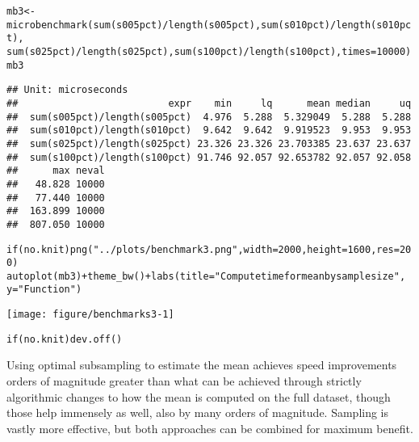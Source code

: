 \documentclass{article}\usepackage[]{graphicx}\usepackage[]{color}
\makeatletter
\def\maxwidth{ %
  \ifdim\Gin@nat@width>\linewidth
    \linewidth
  \else
    \Gin@nat@width
  \fi
}
\newcommand{\hlnum}[1]{\textcolor[rgb]{0.863,0.196,0.184}{#1}}%
\newcommand{\hlstr}[1]{\textcolor[rgb]{0.863,0.196,0.184}{#1}}%
\newcommand{\hlopt}[1]{\textcolor[rgb]{0.576,0.631,0.631}{#1}}%
\newcommand{\hlstd}[1]{\textcolor[rgb]{0.514,0.58,0.588}{#1}}%
\newcommand{\hlkwa}[1]{\textcolor[rgb]{0.796,0.294,0.086}{#1}}%
\newcommand{\hlkwb}[1]{\textcolor[rgb]{0.522,0.6,0}{#1}}%
\newcommand{\hlkwc}[1]{\textcolor[rgb]{0.796,0.294,0.086}{#1}}%
\newcommand{\hlkwd}[1]{\textcolor[rgb]{0.576,0.631,0.631}{#1}}%
\newenvironment{kframe}{%
 \def\at@end@of@kframe{}%
 \ifinner\ifhmode%
  \def\at@end@of@kframe{\end{minipage}}%
  \begin{minipage}{\columnwidth}%
 \fi\fi%
 \def\FrameCommand##1{\hskip\@totalleftmargin \hskip-\fboxsep
 \colorbox{shadecolor}{##1}\hskip-\fboxsep
     \hskip-\linewidth \hskip-\@totalleftmargin \hskip\columnwidth}%
 \MakeFramed {\advance\hsize-\width
   \@totalleftmargin\z@ \linewidth\hsize
   \@setminipage}}%
 {\par\unskip\endMakeFramed%
 \at@end@of@kframe}
\newenvironment{knitrout}{}{} %
\makeatother
\begin{document}
\begin{knitrout}
\color{fgcolor}\begin{kframe}
\begin{alltt}
\hlstd{mb3} \hlkwb{<-} \hlkwd{microbenchmark}\hlstd{(}\hlkwd{sum}\hlstd{(s005pct)}\hlopt{/}\hlkwd{length}\hlstd{(s005pct),} \hlkwd{sum}\hlstd{(s010pct)}\hlopt{/}\hlkwd{length}\hlstd{(s010pct),}
    \hlkwd{sum}\hlstd{(s025pct)}\hlopt{/}\hlkwd{length}\hlstd{(s025pct),} \hlkwd{sum}\hlstd{(s100pct)}\hlopt{/}\hlkwd{length}\hlstd{(s100pct),} \hlkwc{times} \hlstd{=} \hlnum{10000}\hlstd{)}
\hlstd{mb3}
\end{alltt}
\begin{verbatim}
## Unit: microseconds
##                          expr    min     lq      mean median     uq
##  sum(s005pct)/length(s005pct)  4.976  5.288  5.329049  5.288  5.288
##  sum(s010pct)/length(s010pct)  9.642  9.642  9.919523  9.953  9.953
##  sum(s025pct)/length(s025pct) 23.326 23.326 23.703385 23.637 23.637
##  sum(s100pct)/length(s100pct) 91.746 92.057 92.653782 92.057 92.058
##      max neval
##   48.828 10000
##   77.440 10000
##  163.899 10000
##  807.050 10000
\end{verbatim}
\begin{alltt}
\hlkwa{if} \hlstd{(no.knit)} \hlkwd{png}\hlstd{(}\hlstr{"../plots/benchmark3.png"}\hlstd{,} \hlkwc{width} \hlstd{=} \hlnum{2000}\hlstd{,} \hlkwc{height} \hlstd{=} \hlnum{1600}\hlstd{,} \hlkwc{res} \hlstd{=} \hlnum{200}\hlstd{)}
\hlkwd{autoplot}\hlstd{(mb3)} \hlopt{+} \hlkwd{theme_bw}\hlstd{()} \hlopt{+} \hlkwd{labs}\hlstd{(}\hlkwc{title} \hlstd{=} \hlstr{"Compute time for mean by sample size"}\hlstd{,}
    \hlkwc{y} \hlstd{=} \hlstr{"Function"}\hlstd{)}
\end{alltt}
\end{kframe}
\texttt{[image: figure/benchmarks3-1]} 
\begin{kframe}\begin{alltt}
\hlkwa{if} \hlstd{(no.knit)} \hlkwd{dev.off}\hlstd{()}
\end{alltt}
\end{kframe}
\end{knitrout}

Using optimal subsampling to estimate the mean achieves speed improvements orders of magnitude greater than what can be achieved through strictly algorithmic changes to how the mean is computed on the full dataset,
though those help immensely as well, also by many orders of magnitude.
Sampling is vastly more effective, but both approaches can be combined for maximum benefit.
\end{document}
